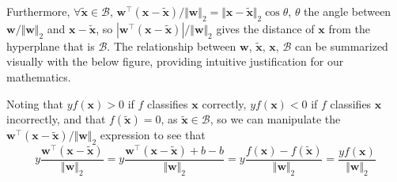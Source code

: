 \documentclass{article}
\numberwithin{equation}{section}
\begin{document}
Furthermore, $ \forall \tilde{\mathbf{x}} \in \mathcal{B} $,
$ \mathbf{w}^\top(\mathbf{x} - \tilde{\mathbf{x}}) / \Vert\mathbf{w}\Vert_2 =
\Vert\mathbf{x} - \tilde{\mathbf{x}}\Vert_2\cos\theta $, $ \theta $ the angle
between $ \mathbf{w} / \Vert\mathbf{w}\Vert_2 $ and
$ \mathbf{x} - \tilde{\mathbf{x}} $, so $ |\mathbf{w}^\top(\mathbf{x} -
\tilde{\mathbf{x}})| / \Vert\mathbf{w}\Vert_2 $ gives the distance of
$ \mathbf{x} $ from the hyperplane that is $ \mathcal{B} $. The relationship
between $ \mathbf{w} $, $ \tilde{\mathbf{x}} $, $ \mathbf{x} $,
$ \mathcal{B} $ can be summarized visually with the below figure, providing
intuitive justification for our mathematics.
\begin{figure}[h]
    \centering
    \label{fig:3.2.1}
\end{figure}

Noting that $ yf(\mathbf{x}) > 0 $ if $ f $ classifies $ \mathbf{x} $
correctly, $ yf(\mathbf{x}) < 0 $ if $ f $ classifies $ \mathbf{x} $
incorrectly, and that $ f(\tilde{\mathbf{x}}) = 0 $, as
$ \tilde{\mathbf{x}} \in \mathcal{B} $, so we can manipulate the
$ \mathbf{w}^\top(\mathbf{x} - \tilde{\mathbf{x}}) / \Vert\mathbf{w}\Vert_2 $
expression to see that
\begin{equation*}
    y\frac{
        \mathbf{w}^\top(\mathbf{x} - \tilde{\mathbf{x}})
    }{
        \Vert\mathbf{w}\Vert_2
    } =
    y\frac{
        \mathbf{w}^\top(\mathbf{x} - \tilde{\mathbf{x}}) + b - b
    }{
        \Vert\mathbf{w}\Vert_2
    } =
    y\frac{f(\mathbf{x}) - f(\tilde{\mathbf{x}})}{\Vert\mathbf{w}\Vert_2} =
    \frac{yf(\mathbf{x})}{\Vert\mathbf{w}\Vert_2}
\end{equation*}
\end{document}
